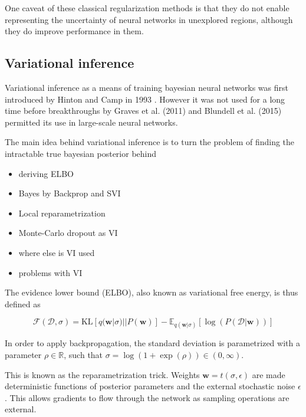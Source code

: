 	One caveat of these classical regularization methods is that they do not enable representing the uncertainty of neural networks in unexplored regions, although they do improve performance in them. 

\subsection{Variational inference}


	Variational inference as a means of training bayesian neural networks was first introduced by Hinton and Camp in 1993 \cite{hinton_keeping_1993}. However it was not used for a long time before breakthroughs by Graves et al. (2011) \cite{graves_practical_2011} and Blundell et al. (2015) \cite{blundell_weight_2015} permitted its use in large-scale neural networks. 
	
	The main idea behind variational inference is to turn the problem of finding the intractable true bayesian posterior behind 

	\begin{itemize}
		\item deriving ELBO
		
		
		\item Bayes by Backprop and SVI
		\item Local reparametrization
		\item Monte-Carlo dropout as VI
		\item where else is VI used
		\item problems with VI
	\end{itemize}

	The evidence lower bound (ELBO), also known as variational free energy, is thus defined as 
	
	\begin{equation}
	\label{eq:elbo}
		\mathcal{F}(\mathcal{D}, \sigma) = 
		\text{KL}[q(\pmb{w}|\sigma) || P(\pmb{w})] - \mathbb{E}_{q(\pmb{w}|\sigma)}[\log(P(\mathcal{D}|\pmb{w}))]
	\end{equation}

	In order to apply backpropagation, the standard deviation is parametrized with a parameter $\rho \in \mathbb{R}$, such that $\sigma = \log(1 + \exp(\rho)) \in (0,\infty)$. 
	
	This is known as the reparametrization trick. Weights $\pmb{w} = t(\sigma, \epsilon)$ are made deterministic functions of posterior parameters and the external stochastic noise $\epsilon$. This allows gradients to flow through the network as sampling operations are external. 
	
